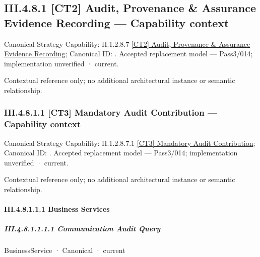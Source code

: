 \subsection*{III.4.8.1 [CT2] Audit, Provenance \& Assurance Evidence Recording — Capability context}
\label{navigation:III.4.8.1}

{\small Canonical Strategy Capability: II.1.2.8.7 \hyperref[element:adf5e2bc81b4468d9bb486b1d77bf92b]{[CT2] Audit, Provenance \& Assurance Evidence Recording}; Canonical ID: \texttt{}. Accepted replacement model — Pass3/014; implementation unverified · current.}\par
Contextual reference only; no additional architectural instance or semantic relationship.\par
\subsubsection*{III.4.8.1.1 [CT3] Mandatory Audit Contribution — Capability context}
\label{navigation:III.4.8.1.1}

{\small Canonical Strategy Capability: II.1.2.8.7.1 \hyperref[element:c9876be3523c4c82bb7cead743139ff4]{[CT3] Mandatory Audit Contribution}; Canonical ID: \texttt{}. Accepted replacement model — Pass3/014; implementation unverified · current.}\par
Contextual reference only; no additional architectural instance or semantic relationship.\par
\paragraph*{III.4.8.1.1.1 Business Services}
\label{navigation:III.4.8.1.1.1}

\subparagraph*{III.4.8.1.1.1.1 Communication Audit Query}
\label{navigation:III.4.8.1.1.1.1}

\label{element:7c871898fd634a16902048da75586fd9}
{\small BusinessService · Canonical · current}\par

